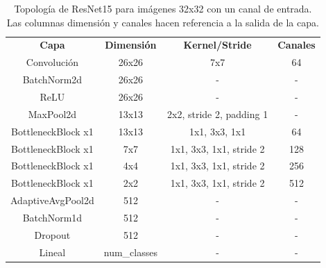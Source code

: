 \begin{table}[]
\begin{tabular}{|c|c|c|c|}
\hline
\multirow{2}{*}{\textbf{Capa}} & \multirow{2}{*}{\textbf{Dimensión}} & \multirow{2}{*}{\textbf{Kernel/Stride}} & \multirow{2}{*}{\textbf{Canales}} \\
                               &                                     &                                         &                                   \\ \hline
Convolución                    & 26x26                               & 7x7                                     & 64                                \\ \hline
BatchNorm2d                    & 26x26                               & -                                       & -                                 \\ \hline
ReLU                           & 26x26                               & -                                       & -                                 \\ \hline
MaxPool2d                      & 13x13                               & 2x2, stride 2, padding 1                & -                                 \\ \hline
BottleneckBlock x1             & 13x13                               & 1x1, 3x3, 1x1                           & 64                                \\ \hline
BottleneckBlock x1             & 7x7                                 & 1x1, 3x3, 1x1, stride 2                 & 128                               \\ \hline
BottleneckBlock x1             & 4x4                                 & 1x1, 3x3, 1x1, stride 2                 & 256                               \\ \hline
BottleneckBlock x1             & 2x2                                 & 1x1, 3x3, 1x1, stride 2                 & 512                               \\ \hline
AdaptiveAvgPool2d              & 512                                 & -                                       & -                                 \\ \hline
BatchNorm1d                    & 512                                 & -                                       & -                                 \\ \hline
Dropout                        & 512                                 & -                                       & -                                 \\ \hline
Lineal                         & num\_classes                        & -                                       & -                                 \\ \hline
\end{tabular}
\caption{Topología de ResNet15 para imágenes 32x32 con un canal de entrada. Las columnas dimensión y canales hacen referencia a la salida de la capa.}
\label{table:resnet15}
\end{table}


